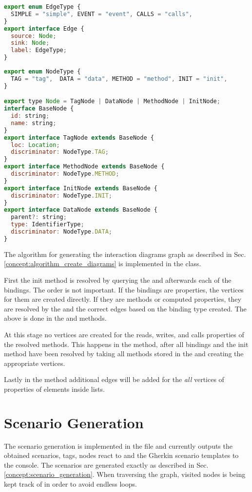 \begin{lstlisting}[language=JavaScript, caption={Interaction Diagram graph edge data type}, captionpos=b]
export enum EdgeType {
  SIMPLE = "simple", EVENT = "event", CALLS = "calls",
}
export interface Edge {
  source: Node;
  sink: Node;
  label: EdgeType;
}
\end{lstlisting}
\begin{lstlisting}[language=JavaScript, caption={Interaction Diagram graph node data type}, captionpos=b]
export enum NodeType {
  TAG = "tag",  DATA = "data", METHOD = "method", INIT = "init",
}

export type Node = TagNode | DataNode | MethodNode | InitNode;
interface BaseNode {
  id: string;
  name: string;
}
export interface TagNode extends BaseNode {
  loc: Location;
  discriminator: NodeType.TAG;
}
export interface MethodNode extends BaseNode {
  discriminator: NodeType.METHOD;
}
export interface InitNode extends BaseNode {
  discriminator: NodeType.INIT;
}
export interface DataNode extends BaseNode {
  parent?: string;
  type: IdentifierType;
  discriminator: NodeType.DATA;
}
\end{lstlisting}


The algorithm for generating the interaction diagrams graph as described in Sec. \ref{concept:algorithm_create_diagrams}
is implemented in the  class. 

First the init method is resolved by querying the  and afterwards each of the bindings. The order is not important. If the bindings are properties, the vertices for them are created directly. If they are methods or computed properties, they are resolved by the  and the correct edges based on the binding type created. The above is done in the  and  methods.

At this stage no vertices are created for the reads, writes, and calls properties of the resolved methods. 
This happens in the  method, after all bindings and the init method have been resolved by taking all methods stored in the  and creating the appropriate vertices.

Lastly in the  method additional edges will be added for the \textit{all} vertices of properties of elements inside lists.

\section{Scenario Generation}
The scenario generation is implemented in the  file and currently outputs the obtained scenarios, tags, nodes react to and the Gherkin scenario templates to the console. The scenarios are generated exactly as described in Sec. \ref{concept:scenario_generation}. When traversing the graph, visited nodes is being kept track of in order to avoid endless loops.

